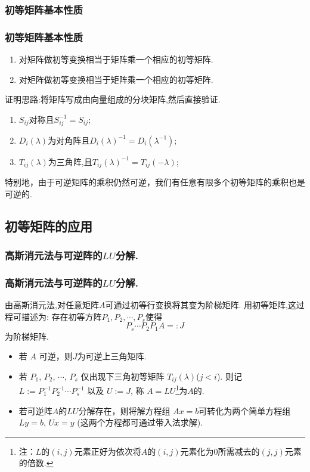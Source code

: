 \subsubsection{初等矩阵基本性质}
\begin{frame}\frametitle{初等矩阵基本性质}

\begin{theorem}
\begin{enumerate}
\item 对矩阵做初等变换相当于矩阵乘一个相应的初等矩阵.
\pp
\item 对矩阵做初等变换相当于矩阵乘一个相应的初等矩阵.
\end{enumerate}
\end{theorem}
\pp
证明思路:将矩阵写成由向量组成的分块矩阵,然后直接验证.
\pp

\begin{proposition}
\begin{enumerate}
\item $S_{ij}$对称且$S_{ij}^{-1}=S_{ij}$; \pp
\item $D_i(\lambda)$为对角阵且$D_i(\lambda)^{-1}=D_i(\lambda^{-1})$; \pp
\item $T_{ij}(\lambda)$为三角阵,且$T_{ij}(\lambda)^{-1}=T_{ij}(-\lambda)$;
\end{enumerate}
\end{proposition}
\pp
特别地，由于可逆矩阵的乘积仍然可逆，我们有任意有限多个初等矩阵的乘积也是可逆的.
\end{frame}



\subsection{初等矩阵的应用}

\subsubsection{高斯消元法与可逆阵的$LU$分解.}
\begin{frame}\frametitle{高斯消元法与可逆阵的$LU$分解.}
由高斯消元法,对任意矩阵$A$可通过初等行变换将其变为阶梯矩阵.
\pp
用初等矩阵,这过程可描述为: 存在初等方阵$P_1,P_2,\cdots,P_s$使得
\[P_s\cdots P_2P_1A =: J\]
为阶梯矩阵.
\pp
\bigskip
\begin{itemize}
\item 若 $A$ 可逆，则$J$为可逆上三角矩阵.
\pp
\bigskip
\item 若 $P_1$, $P_2$, $\cdots$, $P_s$ 仅出现下三角初等矩阵 $T_{ij}(\lambda)$($j<i$). 则记 $L:=P_1^{-1}P_2^{-1}\cdots P_s^{-1}$ 以及 $U:=J$, 称 $A=LU$\footnote{注：$L$的$(i,j)$元素正好为依次将$A$的$(i,j)$元素化为$0$所需减去的$(j,j)$元素的倍数.}为$A$的.
\pp


\pp
\bigskip



\item 若可逆阵$A$的$LU$分解存在，则将解方程组 $Ax=b$可转化为两个简单方程组$Ly=b$, $Ux=y$ (这两个方程都可通过带入法求解).
\end{itemize}
\end{frame}




